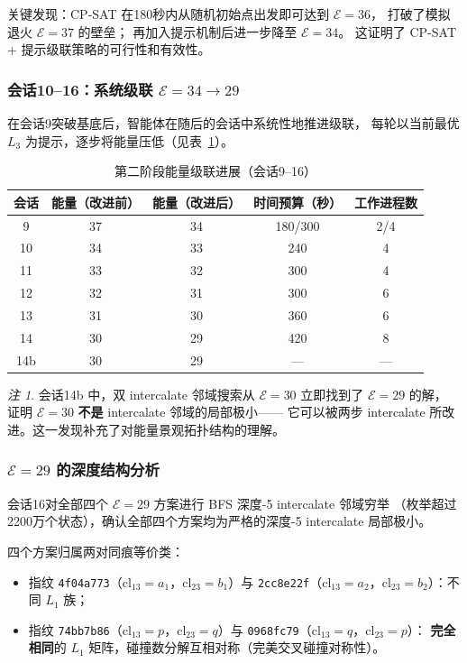 \documentclass[11pt,a4paper]{ctexart}
\theoremstyle{remark}
\newtheorem{remark}[theorem]{注}
\newcommand{\cl}{\mathrm{cl}}
\newcommand{\E}{\mathcal{E}}
\begin{document}
关键发现：CP-SAT 在180秒内从随机初始点出发即可达到 $\E = 36$，
打破了模拟退火 $\E = 37$ 的壁垒；
再加入提示机制后进一步降至 $\E = 34$。
这证明了 CP-SAT + 提示级联策略的可行性和有效性。

\subsubsection{会话10--16：系统级联 $\E = 34 \to 29$}

在会话9突破基底后，智能体在随后的会话中系统性地推进级联，
每轮以当前最优 $L_3$ 为提示，逐步将能量压低（见表~\ref{tab:phase2-cascade}）。

\begin{table}[htbp]
  \centering
  \caption{第二阶段能量级联进展（会话9--16）}
  \label{tab:phase2-cascade}
  \begin{tabular}{ccccc}
    \toprule
    会话 & 能量（改进前） & 能量（改进后） & 时间预算（秒） & 工作进程数 \\
    \midrule
    9  & 37 & 34 & 180/300 & 2/4 \\
    10 & 34 & 33 & 240 & 4 \\
    11 & 33 & 32 & 300 & 4 \\
    12 & 32 & 31 & 300 & 6 \\
    13 & 31 & 30 & 360 & 6 \\
    14 & 30 & 29 & 420 & 8 \\
    14b & 30 & 29 & --- & --- \\
    \bottomrule
  \end{tabular}
\end{table}

\begin{remark}
  会话14b 中，双 intercalate 邻域搜索从 $\E = 30$ 立即找到了 $\E = 29$ 的解，
  证明 $\E = 30$ \textbf{不是} intercalate 邻域的局部极小——
  它可以被两步 intercalate 所改进。这一发现补充了对能量景观拓扑结构的理解。
\end{remark}

\subsubsection{$\E = 29$ 的深度结构分析}

会话16对全部四个 $\E = 29$ 方案进行 BFS 深度-5 intercalate 邻域穷举
（枚举超过2200万个状态），确认全部四个方案均为严格的深度-5 intercalate 局部极小。

四个方案归属两对同痕等价类：

\begin{itemize}[leftmargin=2em]
  \item 指纹 \texttt{4f04a773}（$\cl_{13} = a_1$，$\cl_{23} = b_1$）与
        \texttt{2cc8e22f}（$\cl_{13} = a_2$，$\cl_{23} = b_2$）：不同 $L_1$ 族；
  \item 指纹 \texttt{74bb7b86}（$\cl_{13} = p$，$\cl_{23} = q$）与
        \texttt{0968fc79}（$\cl_{13} = q$，$\cl_{23} = p$）：
        \textbf{完全相同}的 $L_1$ 矩阵，碰撞数分解互相对称（完美交叉碰撞对称性）。
\end{itemize}
\end{document}
